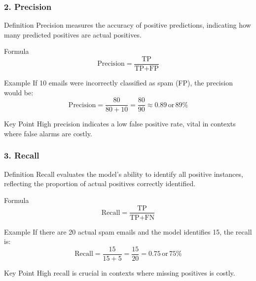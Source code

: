 \documentclass[aspectratio=169]{beamer}
\begin{document}
\begin{frame}[fragile]
    \frametitle{2. Precision}
    \begin{block}{Definition}
        Precision measures the accuracy of positive predictions, indicating how many predicted positives are actual positives.
    \end{block}

    \begin{block}{Formula}
        \begin{equation}
        \text{Precision} = \frac{\text{TP}}{\text{TP} + \text{FP}}
        \end{equation}
    \end{block}

    \begin{block}{Example}
        If 10 emails were incorrectly classified as spam (FP), the precision would be:
        \begin{equation}
        \text{Precision} = \frac{80}{80 + 10} = \frac{80}{90} \approx 0.89 \, \text{or} \, 89\%
        \end{equation}
    \end{block}

    \begin{block}{Key Point}
        High precision indicates a low false positive rate, vital in contexts where false alarms are costly.
    \end{block}
\end{frame}

\begin{frame}[fragile]
    \frametitle{3. Recall}
    \begin{block}{Definition}
        Recall evaluates the model's ability to identify all positive instances, reflecting the proportion of actual positives correctly identified.
    \end{block}

    \begin{block}{Formula}
        \begin{equation}
        \text{Recall} = \frac{\text{TP}}{\text{TP} + \text{FN}}
        \end{equation}
    \end{block}

    \begin{block}{Example}
        If there are 20 actual spam emails and the model identifies 15, the recall is:
        \begin{equation}
        \text{Recall} = \frac{15}{15 + 5} = \frac{15}{20} = 0.75 \, \text{or} \, 75\%
        \end{equation}
    \end{block}

    \begin{block}{Key Point}
        High recall is crucial in contexts where missing positives is costly.
    \end{block}
\end{frame}
\end{document}
